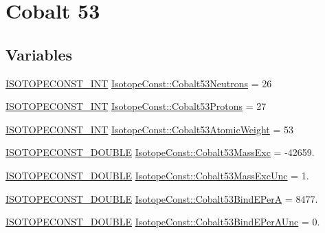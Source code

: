 \hypertarget{group___isotope_const-_cobalt-_co53}{}\section{Cobalt 53}
\label{group___isotope_const-_cobalt-_co53}
\subsection*{Variables}
\begin{DoxyCompactItemize}
\item 
\mbox{\hyperlink{group___isotope_const-_macros_ga5f18360b3e99483a35c32d789e62621c}{I\+S\+O\+T\+O\+P\+E\+C\+O\+N\+S\+T\+\_\+\+I\+NT}} \mbox{\hyperlink{group___isotope_const-_cobalt-_co53_ga6f6724c738621eb1c28f10a0db99d365}{Isotope\+Const\+::\+Cobalt53\+Neutrons}} = 26
\item 
\mbox{\hyperlink{group___isotope_const-_macros_ga5f18360b3e99483a35c32d789e62621c}{I\+S\+O\+T\+O\+P\+E\+C\+O\+N\+S\+T\+\_\+\+I\+NT}} \mbox{\hyperlink{group___isotope_const-_cobalt-_co53_ga7c6e7662081375b462a21a606a0c3019}{Isotope\+Const\+::\+Cobalt53\+Protons}} = 27
\item 
\mbox{\hyperlink{group___isotope_const-_macros_ga5f18360b3e99483a35c32d789e62621c}{I\+S\+O\+T\+O\+P\+E\+C\+O\+N\+S\+T\+\_\+\+I\+NT}} \mbox{\hyperlink{group___isotope_const-_cobalt-_co53_gaa494f6e430e1e08a99d0259d5b1c3525}{Isotope\+Const\+::\+Cobalt53\+Atomic\+Weight}} = 53
\item 
\mbox{\hyperlink{group___isotope_const-_macros_ga8f45a7272ce02c0b4c65c44636ed719a}{I\+S\+O\+T\+O\+P\+E\+C\+O\+N\+S\+T\+\_\+\+D\+O\+U\+B\+LE}} \mbox{\hyperlink{group___isotope_const-_cobalt-_co53_ga8fd61d0e174f09d52a70940c43d23974}{Isotope\+Const\+::\+Cobalt53\+Mass\+Exc}} = -\/42659.
\item 
\mbox{\hyperlink{group___isotope_const-_macros_ga8f45a7272ce02c0b4c65c44636ed719a}{I\+S\+O\+T\+O\+P\+E\+C\+O\+N\+S\+T\+\_\+\+D\+O\+U\+B\+LE}} \mbox{\hyperlink{group___isotope_const-_cobalt-_co53_ga7cf9395a73a2a3c733091f327add27b0}{Isotope\+Const\+::\+Cobalt53\+Mass\+Exc\+Unc}} = 1.
\item 
\mbox{\hyperlink{group___isotope_const-_macros_ga8f45a7272ce02c0b4c65c44636ed719a}{I\+S\+O\+T\+O\+P\+E\+C\+O\+N\+S\+T\+\_\+\+D\+O\+U\+B\+LE}} \mbox{\hyperlink{group___isotope_const-_cobalt-_co53_ga3812386779b2b7f06afeed07a1ca19b4}{Isotope\+Const\+::\+Cobalt53\+Bind\+E\+PerA}} = 8477.
\item 
\mbox{\hyperlink{group___isotope_const-_macros_ga8f45a7272ce02c0b4c65c44636ed719a}{I\+S\+O\+T\+O\+P\+E\+C\+O\+N\+S\+T\+\_\+\+D\+O\+U\+B\+LE}} \mbox{\hyperlink{group___isotope_const-_cobalt-_co53_ga9bb5af45ff6e6b5df24de42589114bc2}{Isotope\+Const\+::\+Cobalt53\+Bind\+E\+Per\+A\+Unc}} = 0.

\end{DoxyCompactItemize}
